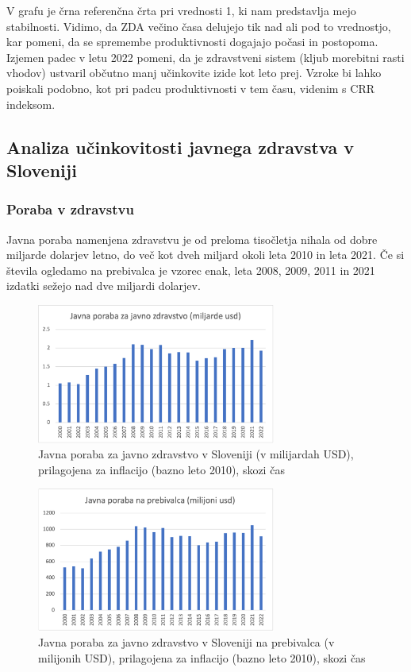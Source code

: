 \documentclass[12pt,a4paper]{article}
\theoremstyle{definition}
\begin{document}
V grafu je črna referenčna črta pri vrednosti 1, ki nam predstavlja mejo stabilnosti. 
Vidimo, da ZDA večino časa delujejo tik nad ali pod to vrednostjo, kar pomeni, 
da se spremembe produktivnosti dogajajo počasi in postopoma. 
Izjemen padec v letu 2022 pomeni, da je zdravstveni sistem (kljub morebitni rasti vhodov) 
ustvaril občutno manj učinkovite izide kot leto prej. Vzroke bi lahko
poiskali podobno, kot pri padcu produktivnosti v tem času, videnim s CRR
indeksom.

\subsection{Analiza učinkovitosti javnega zdravstva v Sloveniji}
\subsubsection{Poraba v zdravstvu}

Javna poraba namenjena zdravstvu je od preloma tisočletja nihala od dobre miljarde dolarjev letno, do več kot dveh miljard okoli leta 2010 in leta 2021. 
Če si števila ogledamo na prebivalca je vzorec enak, leta 2008, 2009, 2011 in 2021 izdatki sežejo nad dve miljardi dolarjev.
\begin{figure}[H]   %
    \centering       %
    \includegraphics[width=0.7\textwidth]{jav_por_zdr_slo.png} %
    \caption{Javna poraba za javno zdravstvo v Sloveniji (v milijardah USD), prilagojena za inflacijo (bazno leto 2010), skozi čas}   %
    \label{fig:jav_por_zdr_slo} %
  \end{figure}

\begin{figure}[H]
    \centering
    \includegraphics[width=0.7\textwidth]{jav_por_prb_slo.png}
    \caption{Javna poraba za javno zdravstvo v Sloveniji na prebivalca (v milijonih USD), prilagojena za inflacijo (bazno leto 2010), skozi čas}
    \label{fig:jav_por_prb_slo.png}
  \end{figure}
\end{document}
